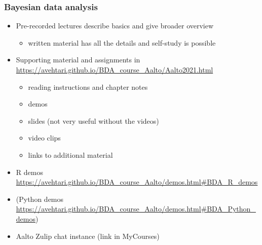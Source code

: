 \documentclass[english]{beamer}
\begin{document}
\begin{frame}
  \frametitle{Bayesian data analysis}  %

  \begin{itemize}
  \item Pre-recorded lectures describe basics and give broader overview
    \begin{itemize}
    \item written material has all the details and self-study
      is possible
    \end{itemize}
  \item Supporting material and assignments in
    {\small\url{https://avehtari.github.io/BDA_course_Aalto/Aalto2021.html}}
    \begin{itemize}
    \item reading instructions and chapter notes
    \item demos
    \item slides (not very useful without the videos)
    \item video clips
    \item links to additional material
    \end{itemize}
   \item R demos {\small\url{https://avehtari.github.io/BDA_course_Aalto/demos.html\#BDA_R_demos}}
  \item (Python demos {\small\url{https://avehtari.github.io/BDA_course_Aalto/demos.html\#BDA_Python_demos})}
  \item Aalto Zulip chat instance (link in MyCourses)
  \end{itemize}

\end{frame}
\end{document}
